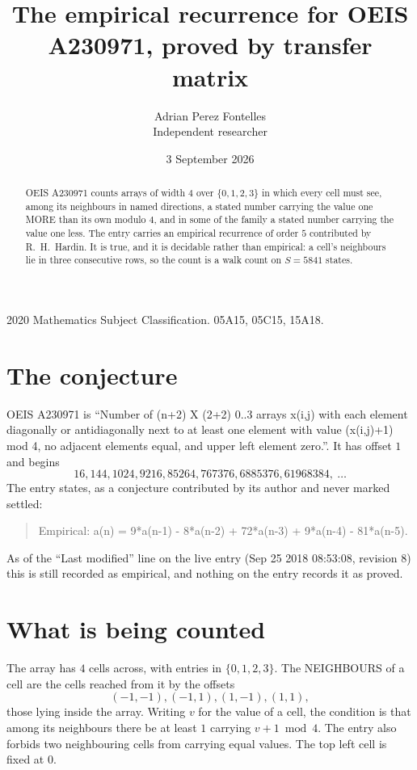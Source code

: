 \documentclass[11pt,a4paper]{article}
\title{The empirical recurrence for OEIS A230971, proved by transfer matrix}
\author{Adrian Perez Fontelles\\ \small Independent researcher}
\date{3 September 2026}
\theoremstyle{plain}
\theoremstyle{definition}
\begin{document}
\maketitle

\begin{abstract}
OEIS A230971 counts arrays of width $4$ over $\{0,1,2,3\}$ in which every cell must see, among its
neighbours in named directions, a stated number carrying the value one MORE than its own
modulo $4$, and in some of the family a stated number carrying the value one less. The entry
carries an empirical recurrence of order $5$ contributed by R.~H.~Hardin. It is true, and
it is decidable rather than empirical: a cell's neighbours lie in three consecutive rows, so
the count is a walk count on $S=5841$ states.
\end{abstract}

\noindent\small 2020 Mathematics Subject Classification. 05A15, 05C15, 15A18.\normalsize

\section{The conjecture}

OEIS A230971 is ``Number of (n+2) X (2+2) 0..3 arrays x(i,j) with each element diagonally or antidiagonally next to at least one element with value (x(i,j)+1) mod 4, no adjacent elements equal, and upper left element zero.''. It has offset $1$ and begins
\[
16, 144, 1024, 9216, 85264, 767376, 6885376, 61968384,\ \dots
\]
The entry states, as a conjecture contributed by its author and never marked settled:
\begin{quote}
Empirical: a(n) = 9*a(n-1) - 8*a(n-2) + 72*a(n-3) + 9*a(n-4) - 81*a(n-5).
\end{quote}
As of the ``Last modified'' line on the live entry (Sep 25 2018 08:53:08, revision 8) this is still
recorded as empirical, and nothing on the entry records it as proved.

\section{What is being counted}

The array has $4$ cells across, with entries in $\{0,1,2,3\}$. The NEIGHBOURS of a cell are the
cells reached from it by the offsets
\[
(-1,-1), (-1,1), (1,-1), (1,1),
\]
those lying inside the array. Writing $v$ for the value of a cell, the condition is that among
its neighbours there be at least $1$ carrying $v+1 \bmod 4$. The entry also forbids two neighbouring cells from carrying equal values. The top left
cell is fixed at $0$.
\end{document}
